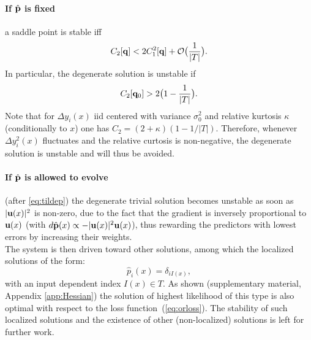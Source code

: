 \paragraph{If $\hat {\bf p}$ is fixed} a saddle point is stable iff
\[
C_2[{\bf q}] < 2C_1^2[{\bf q}]+{\cal O}\bigl(\frac{1}{\vert T\vert}\bigr).
\]
In particular, the degenerate solution is unstable if
\[
C_2[{\bf q}_0] > 2\bigl(1-\frac{1}{\vert T\vert}\bigr).
\]
Note that for $\Delta y_i(x)$ iid centered with variance $\sigma_0^2$ and relative kurtosis $\kappa$ (conditionally to $x$)
one has $C_2 = (2+\kappa)(1-1/\vert T\vert)$. Therefore, whenever $\Delta y_i^2(x)$ fluctuates and the relative curtosis is non-negative, %
the  degenerate solution is unstable and will thus be avoided.

\paragraph{If $\hat {\bf p}$ is allowed to evolve} (after \cref{eq:tildep}) the degenerate trivial solution becomes unstable as soon as $\vert {\bf u}(x)\vert^2$ is non-zero, due to the fact that the gradient is inversely proportional to ${\bf u}(x)$ (with $d\hat{\bf p}(x)\propto -\vert {\bf u}(x)\vert^2 {\bf u}(x)$), thus rewarding the predictors with lowest errors by increasing their weights. \\

The system is then driven toward other solutions, among which the localized solutions of the form: 
\[
\hat p_i(x) = \delta_{iI(x)},
\]
with an input dependent index $I(x)\in T$. As shown (supplementary material, Appendix \ref{app:Hessian}) the solution of highest likelihood of this type is also optimal with respect to the loss function~(\cref{eq:orloss}). The stability of such localized solutions and the existence of other (non-localized) solutions is left for further work.  



